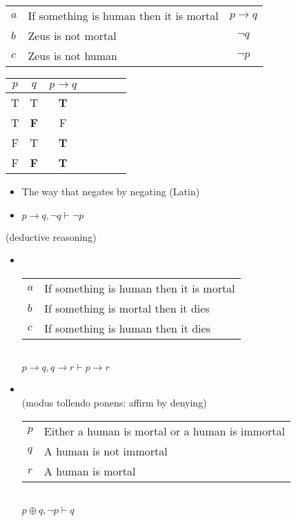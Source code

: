 \documentclass[headrule,footrule]{foils}
\begin{document}
\begin{center}
  \begin{tabular}{llc}
    $a$ & If something is human then it is mortal & $p  \rightarrow q$\\
    $b$ & Zeus is not mortal  & $\neg q$ \\ \hline
    $c$ & Zeus is not human   & $\neg p$
  \end{tabular}

  \begin{tabular}{|c|c|c|c|c|c|c|}
    \hline
    $p$ & $q$ & $p \rightarrow q$  \\
    \hline
    T & T & \textbf{T}  \\ 
    T & \textbf{F} & F  \\ 
    F & T & \textbf{T}  \\ 
    \rowcolor{Gray}
    F & \textbf{F} & \textbf{T}  \\ 
    \hline
  \end{tabular}
\end{center}
\begin{itemize}
\item  The way that negates by negating (Latin)
\item $p \rightarrow q, \neg q \vdash \neg p$
\end{itemize}

(deductive reasoning)
\begin{itemize}
\item {}
\\[2ex]
 \begin{tabular}{ll}
    $a$ & If something is human then it is mortal \\
    $b$ & If something is mortal then it dies \\ \hline
    $c$ & If something is human then it dies
  \end{tabular}
\\ $p \rightarrow q, q \rightarrow r \vdash p \rightarrow r$

\item {}
\\ (modus tollendo ponens: affirm by denying)
\\[2ex]
 \begin{tabular}{ll}
    $p$ & Either a human is mortal or a human is immortal \\
    $q$ & A human is not immortal \\ \hline
    $r$ & A human is mortal
  \end{tabular}
\\ $p \oplus q, \neg p \vdash q$
\end{itemize}
\end{document}
